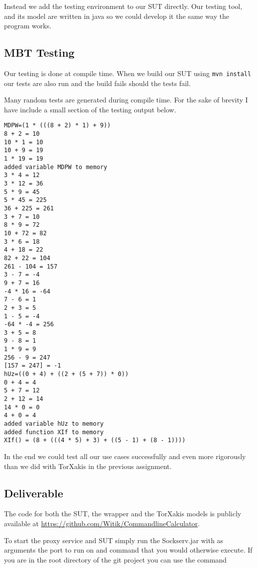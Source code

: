 \documentclass[11pt,a4paper]{article}
\begin{document}
Instead we add the testing environment to our SUT directly. Our
testing tool, and its model are written in java so we could develop it
the same way the program works.

\subsection{MBT Testing}

Our testing is done at compile time. When we build our SUT using
\verb|mvn install| our tests are also run and the build fails should
the tests fail.

Many random tests are generated during compile time. For the sake of
brevity I have include a small section of the testing output below.

\begin{verbatim}
MDPW=(1 * (((8 + 2) * 1) + 9))
8 + 2 = 10
10 * 1 = 10
10 + 9 = 19
1 * 19 = 19
added variable MDPW to memory
3 * 4 = 12
3 * 12 = 36
5 * 9 = 45
5 * 45 = 225
36 + 225 = 261
3 + 7 = 10
8 * 9 = 72
10 + 72 = 82
3 * 6 = 18
4 + 18 = 22
82 + 22 = 104
261 - 104 = 157
3 - 7 = -4
9 + 7 = 16
-4 * 16 = -64
7 - 6 = 1
2 + 3 = 5
1 - 5 = -4
-64 * -4 = 256
3 + 5 = 8
9 - 8 = 1
1 * 9 = 9
256 - 9 = 247
[157 = 247] = -1
hUz=((0 + 4) + ((2 + (5 + 7)) * 0))
0 + 4 = 4
5 + 7 = 12
2 + 12 = 14
14 * 0 = 0
4 + 0 = 4
added variable hUz to memory
added function XIf to memory
XIf() = (8 + (((4 * 5) + 3) + ((5 - 1) + (8 - 1))))
\end{verbatim}

In the end we could test all our use cases successfully and even more
rigorously than we did with TorXakis in the previous assignment.


\subsection{Deliverable}

The code for both the SUT, the wrapper and the TorXakis models is
publicly available at
\url{https://github.com/Witik/CommandlineCalculator}.

To start the proxy service and SUT simply run the Sockserv.jar with as
arguments the port to run on and command that you would otherwise
execute. If you are in the root directory of the git project you can
use the command
\end{document}
